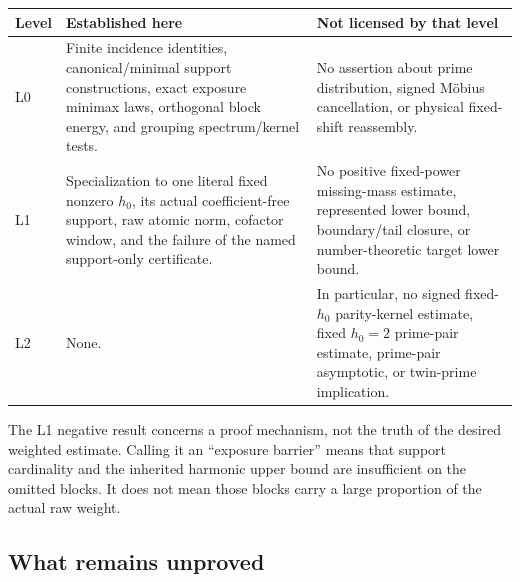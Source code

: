 \begin{center}
\small
\begin{tabular}{>{\raggedright\arraybackslash}p{}
                >{\raggedright\arraybackslash}p{}
                >{\raggedright\arraybackslash}p{}}
\toprule
Level & Established here & Not licensed by that level\\
\midrule
L0
& Finite incidence identities, canonical/minimal support constructions,
  exact exposure minimax laws, orthogonal block energy, and grouping
  spectrum/kernel tests.
& No assertion about prime distribution, signed M\"obius cancellation, or
  physical fixed-shift reassembly.\\
\addlinespace
L1
& Specialization to one literal fixed nonzero \(h_0\), its actual
  coefficient-free support, raw atomic norm, cofactor window, and the
  failure of the named support-only certificate.
& No positive fixed-power missing-mass estimate, represented lower bound,
  boundary/tail closure, or number-theoretic target lower bound.\\
\addlinespace
L2
& None.
& In particular, no signed fixed-\(h_0\) parity-kernel estimate, fixed
  \(h_0=2\) prime-pair estimate, prime-pair asymptotic, or twin-prime
  implication.\\
\bottomrule
\end{tabular}
\end{center}

The L1 negative result concerns a proof mechanism, not the truth of the
desired weighted estimate.  Calling it an ``exposure barrier'' means that
support cardinality and the inherited harmonic upper bound are
insufficient on the omitted blocks.  It does not mean those blocks carry a
large proportion of the actual raw weight.

\subsection{What remains unproved}

